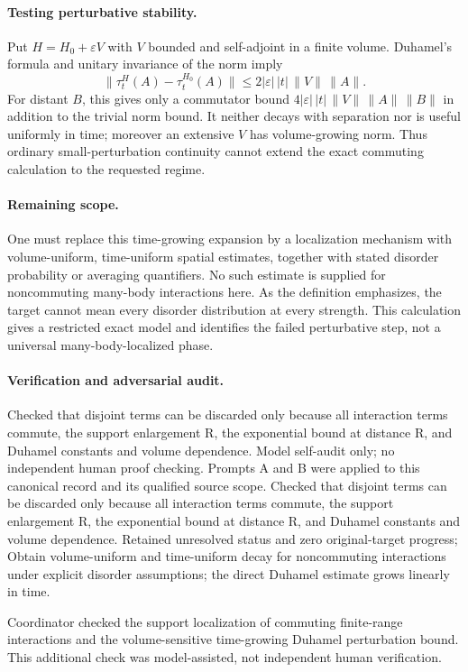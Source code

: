 \documentclass[11pt]{article}
\begin{document}
\paragraph{Testing perturbative stability.}
Put $H=H_0+\varepsilon V$ with $V$ bounded and self-adjoint in a finite volume. Duhamel's formula and unitary invariance of the norm imply
\[
 \|\tau_t^H(A)-\tau_t^{H_0}(A)\|
 \leq 2|\varepsilon|\,|t|\,\|V\|\,\|A\|.
\]
For distant $B$, this gives only a commutator bound
$4|\varepsilon|\,|t|\,\|V\|\,\|A\|\,\|B\|$ in addition to the trivial norm bound. It neither decays with separation nor is useful uniformly in time; moreover an extensive $V$ has volume-growing norm. Thus ordinary small-perturbation continuity cannot extend the exact commuting calculation to the requested regime.

\paragraph{Remaining scope.}
One must replace this time-growing expansion by a localization mechanism with volume-uniform, time-uniform spatial estimates, together with stated disorder probability or averaging quantifiers. No such estimate is supplied for noncommuting many-body interactions here. As the definition emphasizes, the target cannot mean every disorder distribution at every strength. This calculation gives a restricted exact model and identifies the failed perturbative step, not a universal many-body-localized phase.

\paragraph{Verification and adversarial audit.}
Checked that disjoint terms can be discarded only because all interaction terms commute, the support enlargement R, the exponential bound at distance R, and Duhamel constants and volume dependence. Model self-audit only; no independent human proof checking. Prompts A and B were applied to this canonical record and its qualified source scope. Checked that disjoint terms can be discarded only because all interaction terms commute, the support enlargement R, the exponential bound at distance R, and Duhamel constants and volume dependence. Retained unresolved status and zero original-target progress; Obtain volume-uniform and time-uniform decay for noncommuting interactions under explicit disorder assumptions; the direct Duhamel estimate grows linearly in time.

Coordinator checked the support localization of commuting finite-range interactions and the volume-sensitive time-growing Duhamel perturbation bound. This additional check was model-assisted, not independent human verification.
\end{document}
